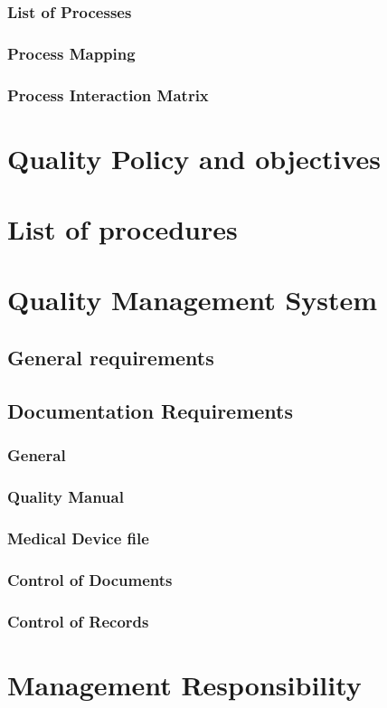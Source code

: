 \documentclass{article}
\begin{document}
\subsubsection{List of Processes}
\subsubsection{Process Mapping}
\subsubsection{Process Interaction Matrix}
\section{Quality Policy and objectives}
\section{List of procedures}
\section {Quality Management System}
\subsection{General requirements}
\subsection{Documentation Requirements}
\subsubsection{General}
\subsubsection{Quality Manual}
\subsubsection{Medical Device file}
\subsubsection{Control of Documents}
\subsubsection{Control of Records}
\section{Management Responsibility}
\end{document}
